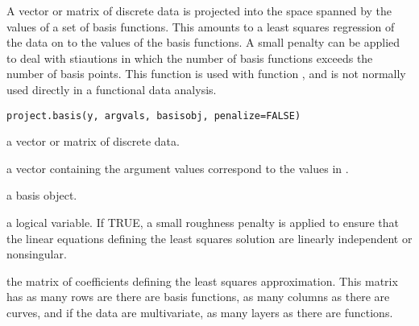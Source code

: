\documentclass{article}
\begin{document}
\begin{Description}\relax
A vector or matrix of discrete data is projected into the space
spanned by the values of a set of basis functions.  This amounts to
a least squares regression of the data on to the values of the basis
functions.  A small penalty can be applied to deal with stiautions in
which the number of basis functions exceeds the number of basis points.
This function is used with function , and is not
normally used directly in a functional data analysis.
\end{Description}
\begin{Usage}
\begin{verbatim}
project.basis(y, argvals, basisobj, penalize=FALSE)
\end{verbatim}
\end{Usage}
\begin{Arguments}
\begin{ldescription}
\item[\code{y}] a vector or matrix of discrete data.

\item[\code{argvals}] a vector containing the argument values correspond to the
values in .

\item[\code{basisobj}] a basis object.

\item[\code{penalize}] a logical variable.  If TRUE, a small roughness penalty is applied
to ensure that the linear equations defining the least squares
solution are linearly independent or nonsingular.

\end{ldescription}
\end{Arguments}
\begin{Value}
the matrix of coefficients defining the least squares approximation.
This matrix has as many rows are there are basis functions, as many
columns as there are curves, and if the data are multivariate, as many
layers as there are functions.
\end{Value}
\begin{SeeAlso}\relax
{}
\end{SeeAlso}
\end{document}
